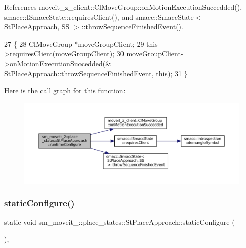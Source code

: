 References moveit\+\_\+z\+\_\+client\+::\+Cl\+Move\+Group\+::on\+Motion\+Execution\+Succedded(), smacc\+::\+I\+Smacc\+State\+::requires\+Client(), and smacc\+::\+Smacc\+State$<$ St\+Place\+Approach, S\+S $>$\+::throw\+Sequence\+Finished\+Event().


\begin{DoxyCode}
27     \{
28         ClMoveGroup *moveGroupClient;
29         this->\hyperlink{classsmacc_1_1ISmaccState_a7f95c9f0a6ea2d6f18d1aec0519de4ac}{requiresClient}(moveGroupClient);
30         moveGroupClient->onMotionExecutionSuccedded(&
      \hyperlink{classsmacc_1_1SmaccState_a49dcfc25824f7e083dd4b999c49ab2b6}{StPlaceApproach::throwSequenceFinishedEvent}, \textcolor{keyword}{this});
31     \}
\end{DoxyCode}
Here is the call graph for this function\+:
\nopagebreak
\begin{figure}[H]
\begin{center}
\leavevmode
\includegraphics[width=350pt]{structsm__moveit__2_1_1place__states_1_1StPlaceApproach_aeda5621011fedf4ba6582ea5e60cee3d_cgraph}
\end{center}
\end{figure}
\mbox{\label{structsm__moveit__2_1_1place__states_1_1StPlaceApproach_ab469a69222c3373956ecf728310bdab3}} 
\subsubsection{\texorpdfstring{static\+Configure()}{staticConfigure()}}
{\footnotesize\ttfamily static void sm\+\_\+moveit\+\_\+::place\+\_\+states\+::\+St\+Place\+Approach\+::static\+Configure (\begin{DoxyParamCaption}{ }\end{DoxyParamCaption})\hspace{0.3cm}{\ttfamily [inline]}, {\ttfamily [static]}}



